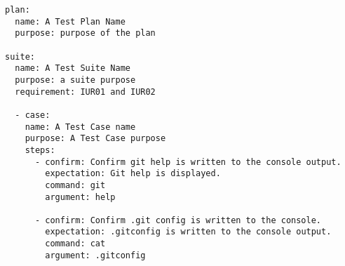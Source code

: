 \begin{lstlisting}
plan:
  name: A Test Plan Name
  purpose: purpose of the plan

suite:
  name: A Test Suite Name
  purpose: a suite purpose
  requirement: IUR01 and IUR02

  - case:
    name: A Test Case name
    purpose: A Test Case purpose
    steps:
      - confirm: Confirm git help is written to the console output.
        expectation: Git help is displayed.
        command: git
        argument: help

      - confirm: Confirm .git config is written to the console.
        expectation: .gitconfig is written to the console output.
        command: cat
        argument: .gitconfig
\end{lstlisting}
